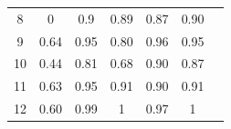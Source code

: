 \documentclass[twoside,11pt]{article}
\begin{document}
\begin{table}[H]
{\begin{tabular}{|c|c|c|c|c|c|c|}
8     & 0                                                              & 0.9                                                                                      & 0.89                                                                               & 0.87                                                                               & 0.90                                                                               &                                                                                       \\ \cline{1-1}
9     & 0.64                                                           & 0.95                                                                                     & 0.80                                                                               & 0.96                                                                               & 0.95                                                                               &                                                                                       \\ \cline{1-1}
10    & 0.44                                                           & 0.81                                                                                     & 0.68                                                                               & 0.90                                                                               & 0.87                                                                               &                                                                                       \\ \cline{1-1}
11    & 0.63                                                           & 0.95                                                                                     & 0.91                                                                               & 0.90                                                                               & 0.91                                                                               &                                                                                       \\ \cline{1-1}
12    & 0.60                                                           & 0.99                                                                                     & 1                                                                                  & 0.97                                                                               & 1                                                                                  &                                                                                       \\ \cline{1-1}

\end{tabular}}
\end{table}
\end{document}
